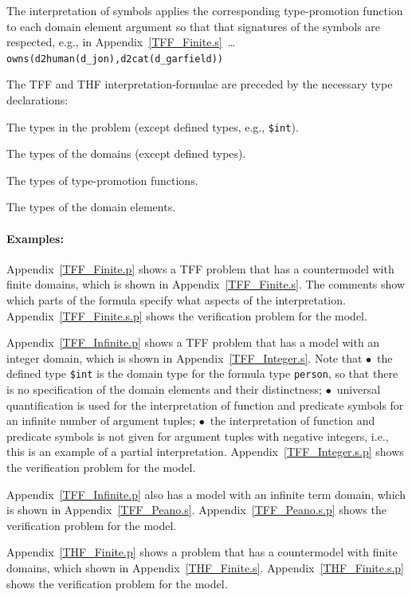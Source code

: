 \documentclass{easychair}
\newcommand{\smalltt}[1]{\small \texttt{#1}}
\newenvironment{packed_itemize}{
\vspace*{-0.3em}
\begin{itemize}
\setlength{\partopsep}{0pt}
\setlength{\itemsep}{1pt}
\setlength{\parskip}{0pt}
\setlength{\parsep}{0pt}
}{\end{itemize}}
\begin{document}
\vspace*{-0.5em}
The interpretation of symbols applies the corresponding type-promotion function to each domain
element argument so that that signatures of the symbols are respected, e.g., in
Appendix~\ref{TFF_Finite.s}~\ldots\\
\hspace*{0.5cm}\smalltt{owns(d2human(d\_jon),d2cat(d\_garfield))}

\vspace*{0.5em}
The TFF and THF interpretation-formulae are preceded by the necessary type declarations:
\begin{packed_itemize}
\item The types in the problem (except defined types, e.g., {\smalltt{\$int}}).
\item The types of the domains (except defined types).
\item The types of type-promotion functions.
\item The types of the domain elements.
\end{packed_itemize}

\paragraph{Examples:}
\begin{packed_itemize}
\item Appendix~\ref{TFF_Finite.p} shows a TFF problem that has a countermodel with finite domains,
      which is shown in Appendix~\ref{TFF_Finite.s}.
      The comments show which parts of the formula specify what aspects of the interpretation.
      Appendix~\ref{TFF_Finite.s.p} shows the verification problem for the model.
\item Appendix~\ref{TFF_Infinite.p} shows a TFF problem that has a model with an integer domain,
      which is shown in Appendix~\ref{TFF_Integer.s}.
      Note that $\bullet$~the defined type {\smalltt{\$int}} is the domain type for the formula 
      type {\smalltt{person}}, so that there is no specification of the domain elements and their 
      distinctness; $\bullet$~universal quantification is used for the interpretation of function 
      and predicate symbols for an infinite number of argument tuples; $\bullet$~the 
      interpretation of function and predicate symbols is not given for argument tuples with 
      negative integers, i.e., this is an example of a partial interpretation.
      Appendix~\ref{TFF_Integer.s.p} shows the verification problem for the model.
\item Appendix~\ref{TFF_Infinite.p} also has a model with an infinite term domain, which is
      shown in Appendix~\ref{TFF_Peano.s}.
      Appendix~\ref{TFF_Peano.s.p} shows the verification problem for the model.
\item Appendix~\ref{THF_Finite.p} shows a problem that has a countermodel with finite domains,
      which shown in Appendix~\ref{THF_Finite.s}.
      Appendix~\ref{THF_Finite.s.p} shows the verification problem for the model.
\end{packed_itemize}
\end{document}
